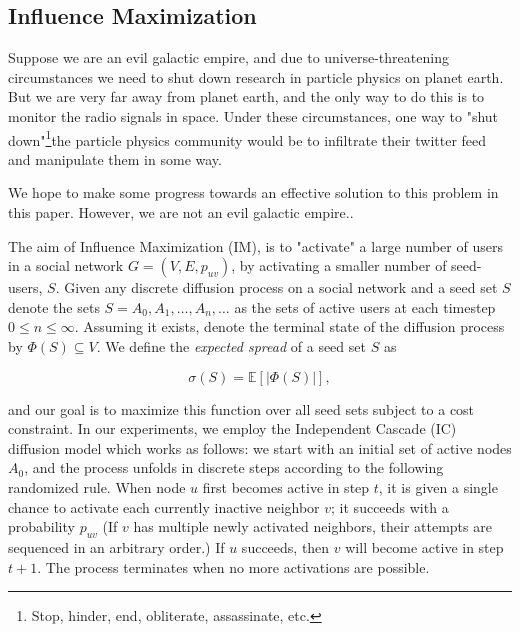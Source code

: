 \documentclass[sigconf]{acmart}
\begin{document}
\subsection{Influence Maximization}

Suppose we are an evil galactic empire, and due to universe-threatening circumstances we need to shut down research in particle physics on planet earth. But we are very far away from planet earth, and the only way to do this is to monitor the radio signals in space. Under these circumstances, one way to "shut down"\footnote{Stop, hinder, end, obliterate, assassinate, etc.}the particle physics community would be to infiltrate their twitter feed and manipulate them in some way. 

We hope to make some progress towards an effective solution to this problem in this paper. However, we are not an evil galactic empire..

The aim of Influence Maximization (IM), is to "activate" a large number of users in a social network $G = (V, E, p_{uv})$, by activating a smaller number of seed-users, $S$. Given any discrete diffusion process on a social network and a seed set $S$ denote the sets $S = A_0, A_1, \dots, A_n, \dots$ as the sets of active users at each timestep $0 \leq n \leq \infty$. Assuming it exists, denote the terminal state of the diffusion process by $\Phi(S) \subseteq V$. We define the \emph{expected spread} of a seed set $S$ as

\begin{equation}
\sigma(S) = \mathbb{E}\left[ |\Phi(S)| \right],
\end{equation}

and our goal is to maximize this function over all seed sets subject to a cost constraint. In our experiments, we employ the Independent Cascade (IC) diffusion model which works as follows: we start with an initial set of active nodes $A_0$, and the process unfolds in discrete steps according to the following randomized rule. When node $u$ first becomes active in step $t$, it is given a single chance to activate each currently inactive neighbor $v$; it succeeds with a probability $p_{uv}$ (If $v$ has multiple newly activated neighbors, their attempts are sequenced in an arbitrary order.) If $u$ succeeds, then $v$ will become active in step $t + 1$. The process terminates when no more activations are possible.
\end{document}
